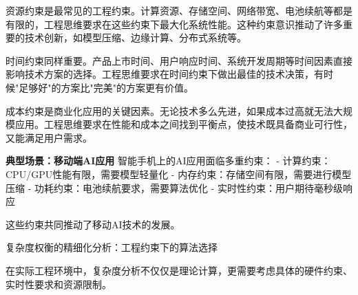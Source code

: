 资源约束是最常见的工程约束。计算资源、存储空间、网络带宽、电池续航等都是有限的，工程思维要求在这些约束下最大化系统性能。这种约束意识推动了许多重要的技术创新，如模型压缩、边缘计算、分布式系统等。

时间约束同样重要。产品上市时间、用户响应时间、系统开发周期等时间因素直接影响技术方案的选择。工程思维要求在时间约束下做出最佳的技术决策，有时候"足够好"的方案比"完美"的方案更有价值。

成本约束是商业化应用的关键因素。无论技术多么先进，如果成本过高就无法大规模应用。工程思维要求在性能和成本之间找到平衡点，使技术既具备商业可行性，又能满足用户需求。

\textbf{典型场景：移动端AI应用}
智能手机上的AI应用面临多重约束：
- 计算约束：CPU/GPU性能有限，需要模型轻量化
- 内存约束：存储空间有限，需要进行模型压缩
- 功耗约束：电池续航要求，需要算法优化
- 实时性约束：用户期待毫秒级响应

这些约束共同推动了移动AI技术的发展。

 
复杂度权衡的精细化分析：工程约束下的算法选择

在实际工程环境中，复杂度分析不仅仅是理论计算，更需要考虑具体的硬件约束、实时性要求和资源限制。


%
%
%
%
%
%

